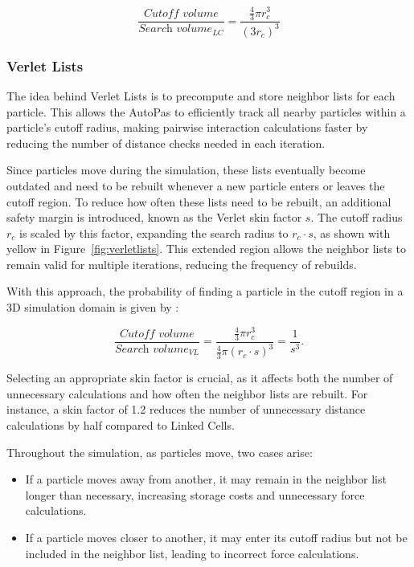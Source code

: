 \[
\frac{\textit{Cutoff volume}}{\textit{Search volume}_{LC}} =
\frac{\frac{4}{3} \pi r_c^3}{(3r_c)^3}
\]

\subsubsection{Verlet Lists}

The idea behind Verlet Lists is to precompute and store neighbor lists for each particle. This allows the AutoPas to efficiently track all nearby particles within a particle's cutoff radius, making pairwise interaction calculations faster by reducing the number of distance checks needed in each iteration.

Since particles move during the simulation, these lists eventually become outdated and need to be rebuilt whenever a new particle enters or leaves the cutoff region. To reduce how often these lists need to be rebuilt, an additional safety margin is introduced, known as the Verlet skin factor \(s\). The cutoff radius \(r_c\) is scaled by this factor, expanding the search radius to \(r_c \cdot s\), as shown with yellow in Figure~\ref{fig:verletlists}. This extended region allows the neighbor lists to remain valid for multiple iterations, reducing the frequency of rebuilds.

With this approach, the probability of finding a particle in the cutoff region in a 3D simulation domain is given by \parencite{gratl2019autopas}:

\[
\frac{\textit{Cutoff volume}}{\textit{Search volume}_{VL}} =
\frac{\frac{4}{3} \pi r_c^3}{\frac{4}{3} \pi (r_c \cdot s)^3} =
\frac{1}{s^3}.
\]


Selecting an appropriate skin factor is crucial, as it affects both the number of unnecessary calculations and how often the neighbor lists are rebuilt. For instance, a skin factor of 1.2 reduces the number of unnecessary distance calculations by half compared to Linked Cells.

Throughout the simulation, as particles move, two cases arise:
\begin{itemize}
    \item If a particle moves away from another, it may remain in the neighbor list longer than necessary, increasing storage costs and unnecessary force calculations.
    \item If a particle moves closer to another, it may enter its cutoff radius but not be included in the neighbor list, leading to incorrect force calculations.
\end{itemize}


